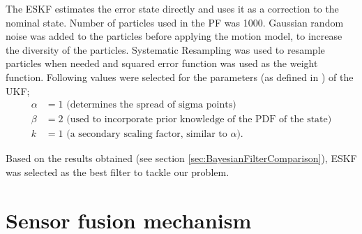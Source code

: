 The \gls{ESKF} estimates the error state directly and uses it as a correction to the nominal state. Number of particles used in the \gls{PF} was 1000. Gaussian random noise was added to the particles before applying the motion model, to increase the diversity of the particles. Systematic Resampling was used to resample particles when needed and squared error function was used as the weight function. Following values were selected for the parameters (as defined in \cite{ch26:wan2000unscented}) of the \gls{UKF};
\begin{align}
	\alpha &= 1 \text{ (determines the spread of sigma points)}\\
	\beta & = 2 \text{ (used to incorporate prior knowledge of the PDF of the state)}\\
	k &= 1 \text{ (a secondary scaling factor, similar to $\alpha$)}.
\end{align}

Based on the results obtained (see section \ref{sec:BayesianFilterComparison}), \gls{ESKF} was selected as the best filter to tackle our problem.









\section{Sensor fusion mechanism}
